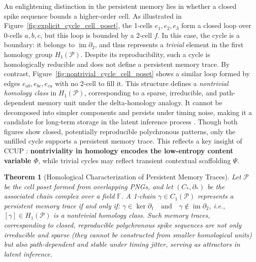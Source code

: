 \documentclass[lettersize,journal]{IEEEtran}
\newtheorem{theorem}{Theorem}
\begin{document}
An enlightening distinction in the persistent memory lies in whether a closed spike sequence bounds a higher-order cell. As illustrated in Figure~\ref{fig:explicit_cycle_cell_poset}, the 1-cells \( e_1, e_2, e_3 \) form a closed loop over 0-cells \( a, b, c \), but this loop is bounded by a 2-cell \( f \). In this case, the cycle is a boundary: it belongs to \( \operatorname{im} \partial_2 \), and thus represents a \emph{trivial} element in the first homology group \( H_1(\mathcal{P}) \). Despite its reproducibility, such a cycle is homologically reducible and does not define a persistent memory trace.
By contrast, Figure~\ref{fig:nontrivial_cycle_cell_poset} shows a similar loop formed by edges \( e_{ab}, e_{bc}, e_{ca} \) with no 2-cell to fill it. This structure defines a \emph{nontrivial homology class} in \( H_1(\mathcal{P}) \), corresponding to a sparse, irreducible, and path-dependent memory unit under the delta-homology analogy. It cannot be decomposed into simpler components and persists under timing noise, making it a candidate for long-term storage in the latent inference process \cite{sukhbaatar2019augmenting}.
Though both figures show closed, potentially reproducible polychronous patterns, only the unfilled cycle supports a persistent memory trace. This reflects a key insight of CCUP \cite{li2025CCUP}: \textbf{nontriviality in homology encodes the low-entropy content variable \( \Phi \)}, while trivial cycles may reflect transient contextual scaffolding \( \Psi \).

\begin{theorem}[Homological Characterization of Persistent Memory Traces]
Let \( \mathcal{P} \) be the cell poset formed from overlapping PNGs, and let \( (C_*, \partial_*) \) be the associated chain complex over a field \( \mathbb{F} \). A 1-chain \( \gamma \in C_1(\mathcal{P}) \) represents a persistent memory trace if and only if:
$\gamma \in \ker \partial_1 \quad \text{and} \quad \gamma \notin \operatorname{im} \partial_2$,
i.e., \( [\gamma] \in H_1(\mathcal{P}) \) is a nontrivial homology class.
Such memory traces, corresponding to closed, reproducible polychronous spike sequences are not only irreducible and sparse (they cannot be constructed from smaller homological units)
but also path-dependent and stable under timing jitter, serving as attractors in latent inference.
\label{thm:homological_persistence}
\end{theorem}
\end{document}
